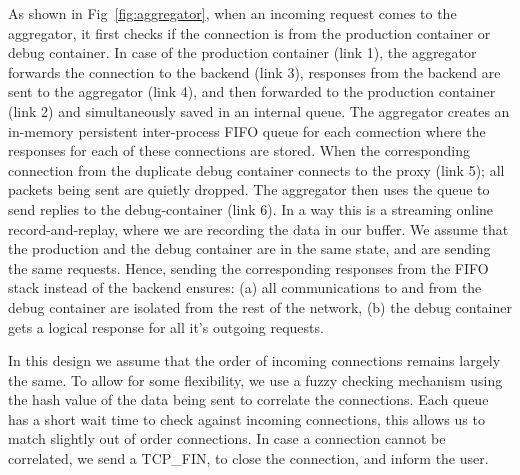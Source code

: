 As shown in  Fig~\ref{fig:aggregator}, when an incoming request comes to the aggregator, it first checks if the connection is from the production container or debug container. 
In case of the production container (link 1), the aggregator forwards the connection to the backend (link 3), responses from the backend are sent to the aggregator (link 4), and then forwarded to the production container (link 2) and simultaneously saved in an internal queue.
The aggregator creates an in-memory persistent inter-process FIFO queue for each connection where the responses for each of these connections are stored.
When the corresponding connection from the duplicate debug container connects to the proxy (link 5); all packets being sent are quietly dropped. 
The aggregator then uses the queue to send replies to the debug-container (link 6).
In a way this is a streaming online record-and-replay, where we are recording the data in our buffer.
We assume that the production and the debug container are in the same state, and are sending the same requests. 
Hence, sending the corresponding responses from the FIFO stack instead of the backend ensures: (a) all communications to and from the debug container are isolated from the rest of the network, (b) the debug container gets a logical response for all it's outgoing requests.

In this design we assume that the order of incoming connections remains largely the same.
To allow for some flexibility, we use a fuzzy checking mechanism using the hash value of the data being sent to correlate the connections. 
Each queue has a short wait time to check against incoming connections, this allows us to match slightly out of order connections.
In case a connection cannot be correlated, we send a TCP\_FIN, to close the connection, and inform the user.


